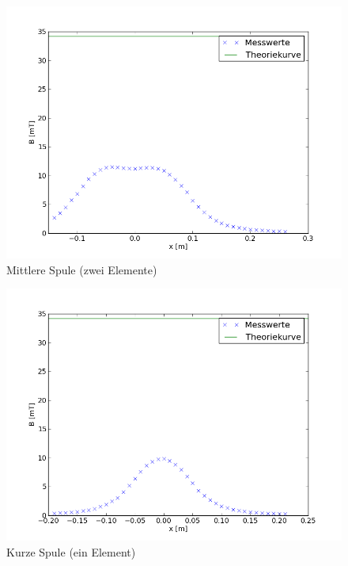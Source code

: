 \documentclass[11pt,ngerman,a4paper]{article}
\begin{document}
\begin{figure}[htp]
\centering
\includegraphics[scale=0.7]{e22.png}
\caption{Mittlere Spule (zwei Elemente)}
\label{hhspule}
\end{figure}

\begin{figure}[htp]
\centering
\includegraphics[scale=0.7]{e23.png}
\caption{Kurze Spule (ein Element)}
\label{plot6}
\end{figure}
\end{document}
